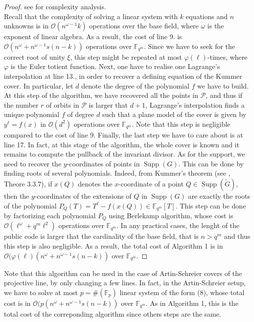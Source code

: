 \documentclass[10pt]{article}
\theoremstyle{definition}
\theoremstyle{definition}
\theoremstyle{definition}
\newcommand{\s}{\vspace{0.3cm}}
\newcommand{\calO}{\mathcal{O}}
\newcommand{\fqm}{\mathbb{F}_{q^m}}
\newcommand{\w}{\omega}
\newcommand{\PR}{\mathcal{P}}
\newcommand{\Supp}{\operatorname{Supp}}
\begin{document}
\begin{proof} see \cite{CF} for complexity analysis. \\
Recall that the complexity of solving a linear system with $k$ equations and $n$ unknowns is in $\calO(n^{\w-1}k)$ operations over the base field, where $\w$ is the exponent of linear algebra. As a result, the cost of line 9. is $\calO(n^{\w}+n^{\w-1}s(n-k))$ operations over $\fqm$. Since we have to seek for the correct root of unity $\xi$, this step might be repeated at most $\varphi(\ell)$-times, where $\varphi$ is the Euler totient function. Next, one have to realise one Lagrange's interpolation at line 13., in order to recover a defining equation of the Kummer cover. In particular, let $d$ denote the degree of the polynomial $f$ we have to build. At this step of the algorithm, we have recovered all the points in $\PR$, and thus if the number $r$ of orbits in $\PR$ is larger that $d+1$, Lagrange's interpolation finds a unique polynomial $f$ of degree $d$ such that a plane model of the cover is given by $y^{\ell}=f(x)$ in $\calO(d^2)$ operations over $\fqm$. Note that this step is negligible compared to the cost of line 9. Finally, the last step we have to care about is at line 17. In fact, at this stage of the algorithm, the whole cover is known and it remains to compute the pullback of the invariant divisor. As for the support, we need to recover the $y$-coordinates of points in $\Supp(G)$. This can be done by finding roots of several polynomials. Indeed, from Kummer's theorem (see \cite{Sti}, Theore 3.3.7), if $x(Q)$ denotes the $x$-coordinate of a point $Q \in \Supp(\tilde{G})$, then the $y$-coordinates of the extensions of $Q$ in $\Supp(G)$ are exactly the roots of the polynomial $P_Q(T)=T^{\ell}-f(x(Q)) \in \fqm[T]$. This step can be done by factorizing each polynomial $P_Q$ using Berlekamp algorithm, whose cost is $\calO(\ell^{\w}+q^m\ell^{2})$ operations over $\fqm$. In any practical cases, the lenght of the public code is larger that the cardinality of the base field, that is $n > q^m$ and thus this step is also negligible. As a result, the total cost of Algorithm 1 is in $\calO(\varphi(\ell)(n^{\w}+n^{\w-1}s(n-k))$ over $\fqm$.
\end{proof}

\s

Note that this algorithm can be used in the case of Artin-Schreier covers of the projective line, by only changing a few lines. In fact, in the Artin-Schreier setup, we have to solve at most $p = \#(\mathbb{F}_p)$ linear system of the form (8), whose total cost is in $\calO(p(n^{\w}+n^{\w-1}s(n-k))$ over $\fqm$. As in Algorithm 1, this is the total cost of the correponding algorithm since others steps are the same.
\end{document}
